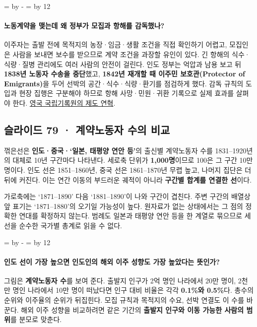 \documentclass[10pt,a4paper]{article}
\newcommand{\ReserveQuestionSpace}{%
  \par\begingroup
  \dimen0=\pagegoal \advance\dimen0 by -\pagetotal
  \dimen2=\baselineskip \multiply\dimen2 by 12
  \ifdim\dimen0<\dimen2 \newpage\fi
  \endgroup}
\begin{document}
\ReserveQuestionSpace
\paragraph{노동계약을 맺는데 왜 정부가 모집과 항해를 감독했나?}
이주자는 출발 전에 목적지의 농장·임금·생활 조건을 직접 확인하기 어렵고, 모집인은 사람을 보내면 보수를 받으므로 계약 조건을 과장할 유인이 있다. 긴 항해의 식수·식량·질병 관리에도 여러 사람의 안전이 걸린다. 인도 정부는 억압과 남용 보고 뒤 \textbf{1838년 노동자 수송을 중단}했고, \textbf{1842년 재개할 때 이주민 보호관(Protector of Emigrants)}을 두어 선박의 공간·식수·식량·환기를 점검하게 했다. 감독 규칙의 도입과 현장 집행은 구분해야 하므로 항해 사망·민원·귀환 기록으로 실제 효과를 살펴야 한다. \href{https://www.nationalarchives.gov.uk/help-with-your-research/research-guides/indian-indentured-labourers/}{영국 국립기록원의 제도 연혁}.\par

\subsection{슬라이드 79 · 계약노동자 수의 비교}
꺾은선은 \textbf{인도·중국·‘일본, 태평양 연안 등’}의 출신별 계약노동자 수를 1831–1920년의 대체로 10년 구간마다 나타낸다. 세로축 단위가 \textbf{1,000명}이므로 100은 그 구간 10만 명이다. 인도 선은 1851–1860년, 중국 선은 1861–1870년 무렵 높고, 나머지 집단은 더 뒤에 커진다. 이는 연간 이동의 부드러운 궤적이 아니라 \textbf{구간별 합계를 연결한 선}이다.\par

가로축에는 ‘1871–1890’ 다음 ‘1881–1890’이 나와 구간이 겹친다. 주변 구간의 배열상 앞 표기는 ‘1871–1880’의 오기일 가능성이 높다. 원자료가 없는 상태에서는 그 점의 정확한 연대를 확정하지 않는다. 범례도 일본과 태평양 연안 등을 한 계열로 묶으므로 세 선을 순수한 국가별 총계로 읽을 수 없다.\par

\ReserveQuestionSpace
\paragraph{인도 선이 가장 높으면 인도인의 해외 이주 성향도 가장 높았다는 뜻인가?}
그림은 \textbf{계약노동자 수}를 보여 준다. 출발지 인구가 2억 명인 나라에서 20만 명이, 2천만 명인 나라에서 10만 명이 떠났다면 인구 대비 비율은 각각 \textbf{0.1\%와 0.5\%}다. 총수의 순위와 이주율의 순위가 뒤집힌다. 모집 규칙과 목적지의 수요, 선박 연결도 이 수를 바꾼다. 해외 이주 성향을 비교하려면 같은 기간의 \textbf{출발지 인구와 이동 가능한 사람의 범위}를 분모로 맞춘다.\par
\end{document}
